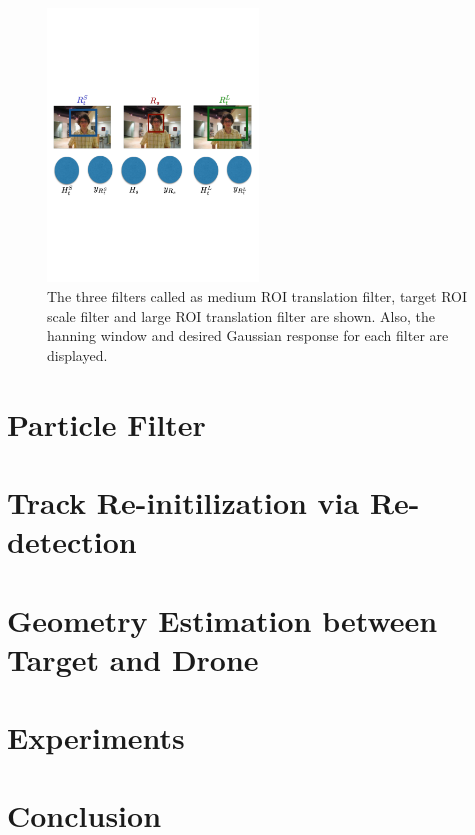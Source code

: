 \documentclass[10pt,twocolumn,letterpaper]{article}
\begin{document}
\begin{figure}[!t]
\includegraphics[width=0.5\textwidth]{figures/Filters_Details.pdf}
\caption{The three filters called as medium ROI translation filter, target ROI scale filter and large ROI translation filter are shown. Also, the hanning window and desired Gaussian response for each filter are displayed.}
\label{fig:Filters}
\end{figure}

\section{Particle Filter}
\label{sc:PF}

\section{Track Re-initilization via Re-detection}
\label{sc:Re-initialization}

\section{Geometry Estimation between Target and Drone}
\label{sc:Geometry}

\section{Experiments}
\label{sc:Experiments}

\section{Conclusion}
\label{sc:Conclusion}


\small


\end{document}
